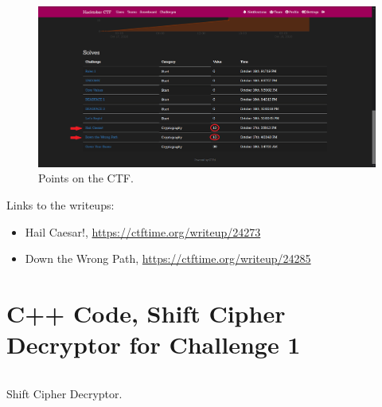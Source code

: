 \documentclass[11 pt]{article}
\begin{document}
\begin{appendices}
\begin{figure}[H]
    \centering
    \includegraphics[width=1\linewidth]{Challenge_confirmation.png}
    \caption{Points on the CTF.}
    \label{fig:pointsconfirmation}
\end{figure}

Links to the writeups:
\begin{itemize}
    \item Hail Caesar!, \url{https://ctftime.org/writeup/24273} 
    \item Down the Wrong Path, \url{https://ctftime.org/writeup/24285}
\end{itemize}

\section{C++ Code, Shift Cipher Decryptor for Challenge 1}
\begin{listing}[h]
\inputminted{C++}{ShiftCipherDecryptor.cpp}
\caption{Shift Cipher Decryptor.}
\label{listing:scd}
\end{listing}

\end{appendices}
\end{document}
